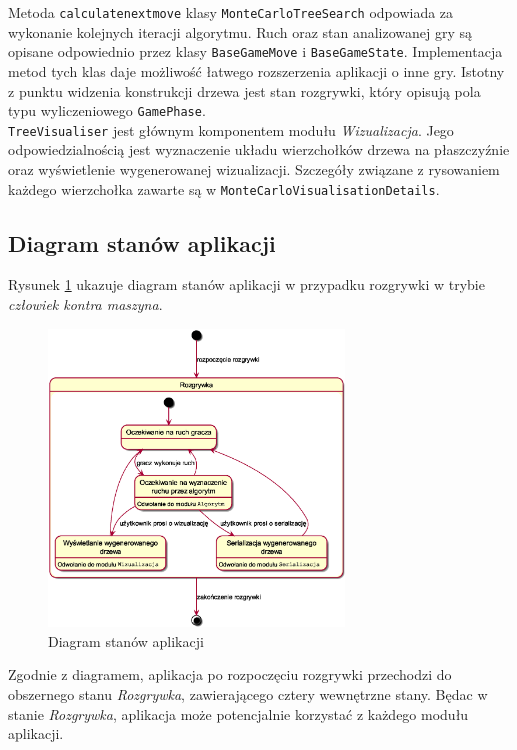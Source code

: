 \documentclass{article}
\newcommand{\code}[1]{\colorbox{light-gray}{\texttt{#1}}}
\newcommand{\modulename}[1]{\textit{#1}}
\begin{document}
	\noindent Metoda \code{calculate\textunderscore next\textunderscore move} klasy \code{MonteCarloTreeSearch} odpowiada za wykonanie kolejnych iteracji algorytmu. Ruch oraz stan analizowanej gry są opisane odpowiednio przez klasy \code{BaseGameMove} i \code{BaseGameState}. Implementacja metod tych klas daje możliwość łatwego rozszerzenia aplikacji o inne gry. Istotny z punktu widzenia konstrukcji drzewa jest stan rozgrywki, który opisują pola typu wyliczeniowego \code{GamePhase}. \\
	
	\noindent \code{TreeVisualiser} jest głównym komponentem modułu \modulename{Wizualizacja}. Jego odpowiedzialnością jest wyznaczenie układu wierzchołków drzewa na płaszczyźnie oraz wyświetlenie wygenerowanej wizualizacji. Szczegóły związane z rysowaniem każdego wierzchołka zawarte są w \code{MonteCarloVisualisationDetails}.
	
	\clearpage
	\subsection{Diagram stanów aplikacji}
	\noindent Rysunek \ref{rys:statediagram} ukazuje diagram stanów aplikacji w przypadku rozgrywki w trybie \modulename{człowiek kontra maszyna}. 
	\begin{figure}[h]
		\centering
		\includegraphics[width=0.7\textwidth]{statediagram}
		\caption{Diagram stanów aplikacji}
		\label{rys:statediagram}
	\end{figure}

	\noindent Zgodnie z diagramem, aplikacja po rozpoczęciu rozgrywki przechodzi do obszernego stanu \modulename{Rozgrywka}, zawierającego cztery wewnętrzne stany. Będac w stanie \modulename{Rozgrywka}, aplikacja może potencjalnie korzystać z każdego modułu aplikacji. \\
	
\end{document}
